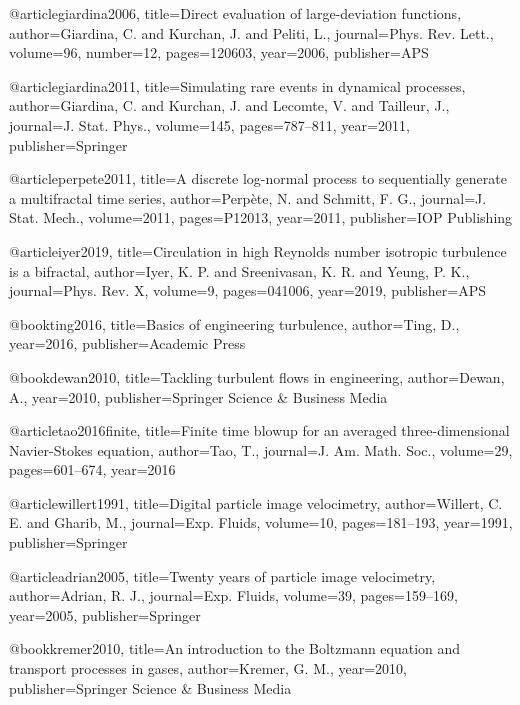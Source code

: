 @article{giardina2006,
  title={Direct evaluation of large-deviation functions},
  author={Giardina, C. and Kurchan, J. and Peliti, L.},
  journal={Phys. Rev. Lett.},
  volume={96},
  number={12},
  pages={120603},
  year={2006},
  publisher={APS}
}

@article{giardina2011,
  title={Simulating rare events in dynamical processes},
  author={Giardina, C. and Kurchan, J. and Lecomte, V. and Tailleur, J.},
  journal={J. Stat. Phys.},
  volume={145},
  pages={787--811},
  year={2011},
  publisher={Springer}
}

@article{perpete2011,
  title={A discrete log-normal process to sequentially generate a multifractal time series},
  author={Perp{\`e}te, N. and Schmitt, F. G.},
  journal={J. Stat. Mech.},
  volume={2011},
  pages={P12013},
  year={2011},
  publisher={IOP Publishing}
}

@article{iyer2019,
  title={{Circulation in high Reynolds number isotropic turbulence is a bifractal}},
  author={Iyer, K. P. and Sreenivasan, K. R. and Yeung, P. K.},
  journal={Phys. Rev. X},
  volume={9},
  pages={041006},
  year={2019},
  publisher={APS}
}

@book{ting2016,
  title={Basics of engineering turbulence},
  author={Ting, D.},
  year={2016},
  publisher={Academic Press}
}

@book{dewan2010,
  title={Tackling turbulent flows in engineering},
  author={Dewan, A.},
  year={2010},
  publisher={Springer Science \& Business Media}
}

@article{tao2016finite,
  title={{Finite time blowup for an averaged three-dimensional Navier-Stokes equation}},
  author={Tao, T.},
  journal={J. Am. Math. Soc.},
  volume={29},
  pages={601--674},
  year={2016}
}

@article{willert1991,
  title={Digital particle image velocimetry},
  author={Willert, C. E. and Gharib, M.},
  journal={Exp. Fluids},
  volume={10},
  pages={181--193},
  year={1991},
  publisher={Springer}
}


@article{adrian2005,
  title={Twenty years of particle image velocimetry},
  author={Adrian, R. J.},
  journal={Exp. Fluids},
  volume={39},
  pages={159--169},
  year={2005},
  publisher={Springer}
}

@book{kremer2010,
  title={{An introduction to the Boltzmann equation and transport processes in gases}},
  author={Kremer, G. M.},
  year={2010},
  publisher={Springer Science \& Business Media}
}

